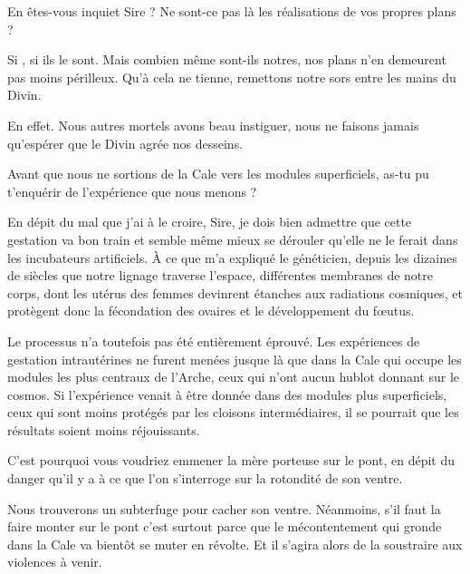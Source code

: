 \begin{drama}
  \alexasspeaks En êtes-vous inquiet Sire ? Ne sont-ce pas là les réalisations de vos propres plans ?

  \elenaspeaks Si \alexas{}, si ils le sont. Mais combien même sont-ils notres, nos plans n’en demeurent pas moins périlleux. Qu’à cela ne tienne, remettons notre sors entre les mains du Divin.

  \alexasspeaks En effet. Nous autres mortels avons beau instiguer, nous ne faisons jamais qu’espérer que le Divin agrée nos desseins.

  \elenaspeaks Avant que nous ne sortions de la Cale vers les modules superficiels, as-tu pu t’enquérir de l’expérience que nous menons ?

  \alexasspeaks En dépit du mal que j’ai à le croire, Sire, je dois bien admettre que cette gestation va bon train et semble même mieux se dérouler qu’elle ne le ferait dans les incubateurs artificiels. À ce que m’a expliqué le généticien, depuis les dizaines de siècles que notre lignage traverse l’espace, différentes membranes de notre corps, dont les utérus des femmes devinrent étanches aux radiations cosmiques, et protègent donc la fécondation des ovaires et le développement du fœutus.

  \elenaspeaks Le processus n’a toutefois pas été entièrement éprouvé. Les expériences de gestation intrautérines ne furent menées jusque là que dans la Cale qui occupe les modules les plus centraux de l’Arche, ceux qui n’ont aucun hublot donnant sur le cosmos. Si l’expérience venait à être donnée dans des modules plus superficiels, ceux qui sont moins protégés par les cloisons intermédiaires, il se pourrait que les résultats soient moins réjouissants.

  \alexasspeaks C’est pourquoi vous voudriez emmener la mère porteuse sur le pont, en dépit du danger qu’il y a à ce que l’on s’interroge sur la rotondité de son ventre.

  \elenaspeaks Nous trouverons un subterfuge pour cacher son ventre. Néanmoins, s’il faut la faire monter sur le pont c’est surtout parce que le mécontentement qui gronde dans la Cale va bientôt se muter en révolte. Et il s’agira alors de la soustraire aux violences à venir.
\end{drama}

\scene


\StageDirII{\elena, \alexas}



